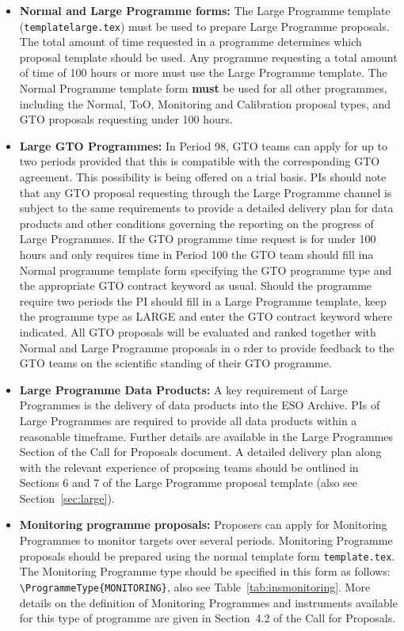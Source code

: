 \documentclass{article}
\begin{document}
\begin{itemize}

\item{\bf Normal and Large Programme forms:}
The Large Programme template ({\tt templatelarge.tex}) must be used to
prepare Large Programme proposals. The total amount of time requested in a programme determines which proposal template should be used.
Any programme requesting a total amount of time of 100 hours or more
must use the Large Programme template.
The Normal Programme template form {\bf must} be used for all other programmes,
including the Normal, ToO, Monitoring and Calibration proposal types, and GTO proposals
requesting under 100 hours.

\item{\bf Large GTO Programmes:} 
In Period 98, GTO teams can apply for up to two periods provided that this is compatible with the 
corresponding GTO agreement. 
This possibility is being offered on a trial basis. PIs should note that any GTO proposal requesting through the Large Programme channel is subject to the same requirements to provide a detailed delivery plan for data products and other conditions governing the reporting on the progress of Large Programmes.
If the GTO programme time request is for under 100 hours and only requires time in Period 100 the GTO team should fill ina Normal programme template form specifying the GTO programme type and the appropriate GTO contract keyword as usual. 
Should the programme require two periods the PI should fill in a Large Programme template,
keep the programme type as LARGE and enter the GTO contract keyword where indicated.
All GTO proposals will be evaluated and ranked together with Normal and Large Programme proposals in o
rder to provide feedback to the GTO teams on the scientific standing of their GTO programme.


\item{\bf Large Programme Data Products: }
A key requirement of Large Programmes is the delivery of data products into the ESO Archive. PIs of Large Programmes are required to provide all data products within a reasonable timeframe. Further details are available in the Large Programmes Section of the Call for Proposals document.
A detailed delivery plan along with the relevant experience of proposing teams
should be outlined in Sections 6 and 7 of the Large Programme proposal template
(also see Section~\ref{sec:large}).

\item{\bf Monitoring programme proposals:}  
Proposers can apply for Monitoring Programmes to monitor targets over several periods.  
Monitoring Programme proposals should be prepared using the normal template form \verb|template.tex|. 
The Monitoring Programme type should be specified in this form as follows: \verb|\ProgrammeType{MONITORING}|, also see Table~\ref{tab:insmonitoring}.
More details on the definition of Monitoring Programmes and instruments available for this type of programme are given in Section~4.2 of the Call for Proposals.


\end{itemize}
\end{document}

